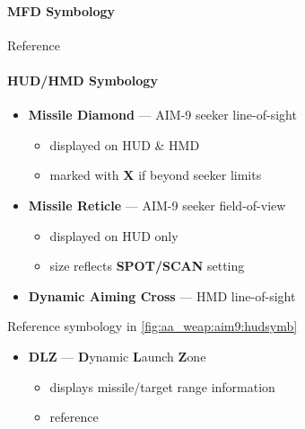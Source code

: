 \paragraph{MFD Symbology} 
Reference 

\paragraph{HUD/HMD Symbology}
\begin{itemize}
    \item \textbf{Missile Diamond} --- AIM-9 seeker line-of-sight
    \begin{itemize}
        \item displayed on HUD \& HMD
        \item marked with \textbf{X} if beyond seeker limits
    \end{itemize}
    \item \textbf{Missile Reticle} --- AIM-9 seeker field-of-view
    \begin{itemize}
        \item displayed on HUD only
        \item size reflects \textbf{SPOT/SCAN} setting 
    \end{itemize}
    \item \textbf{Dynamic Aiming Cross} --- HMD line-of-sight
\end{itemize}

Reference symbology in \cref{fig:aa_weap:aim9:hudsymb}

\begin{itemize}
    \item \textbf{DLZ} --- \textbf{D}ynamic \textbf{L}aunch \textbf{Z}one
    \begin{itemize}
        \item displays missile/target range information
        \item reference 
    \end{itemize}
\end{itemize}

